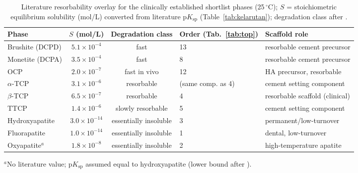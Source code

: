 \documentclass[11pt,a4paper]{article}
\begin{document}
\begin{table}[ht]
\centering\small
\caption{Literature resorbability overlay for the clinically established shortlist phases (25\,$^\circ$C); $S$ = stoichiometric equilibrium solubility (mol/L) converted from literature p$K_\mathrm{sp}$ (Table~\ref{tab:kelarutan}); degradation class after \cite{dorozhkin2009}.}
\label{tab:resorb}
\begin{tabular}{lccll}
\toprule
Phase & $S$ (mol/L) & Degradation class & Order (Tab.~\ref{tab:top}) & Scaffold role \\
\midrule
Brushite (DCPD) & $5.1\times10^{-4}$ & fast & 13 & resorbable cement precursor \\
Monetite (DCPA) & $3.5\times10^{-4}$ & fast & 8 & resorbable cement precursor \\
OCP & $2.0\times10^{-7}$ & fast in vivo & 12 & HA precursor, resorbable \\
$\alpha$-TCP & $3.1\times10^{-6}$ & resorbable & (same comp. as 4) & cement setting component \\
$\beta$-TCP & $6.5\times10^{-7}$ & resorbable & 4 & resorbable scaffold (clinical) \\
TTCP & $1.4\times10^{-6}$ & slowly resorbable & 5 & cement setting component \\
Hydroxyapatite & $3.0\times10^{-14}$ & essentially insoluble & 3 & permanent/low-turnover \\
Fluorapatite & $1.0\times10^{-14}$ & essentially insoluble & 1 & dental, low-turnover \\
Oxyapatite$^{a}$ & $1.8\times10^{-8}$ & essentially insoluble & 2 & high-temperature apatite \\
\bottomrule
\end{tabular}
\vspace{2pt}\footnotesize $^{a}$No literature value; p$K_\mathrm{sp}$ assumed equal to hydroxyapatite (lower bound after \cite{elliott1994}).
\end{table}
\end{document}
